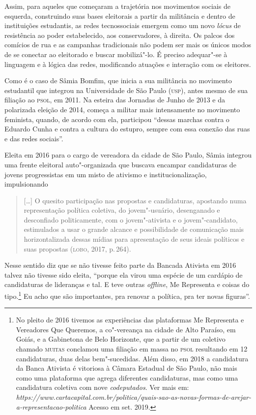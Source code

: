 Assim, para aqueles que começaram a trajetória nos movimentos sociais de
esquerda, construindo suas bases eleitorais a partir da militância e
dentro de instituições estudantis, as redes tecnossociais emergem como
um novo \emph{lócus} de resistência ao poder estabelecido, aos
conservadores, à direita. Os palcos dos comícios de rua e as campanhas
tradicionais não podem ser mais os únicos modos de se conectar ao
eleitorado e buscar mobilizá"-lo. É preciso adequar"-se à linguagem e à
lógica das redes, modificando atuações e interação com os eleitores.

Como é o caso de Sâmia Bomfim, que inicia a sua militância no movimento
estudantil que integrou na Universidade de São Paulo (\textsc{usp}), antes mesmo
de sua filiação ao \textsc{psol}, em 2011. Na esteira das Jornadas de Junho de
2013 e da polarizada eleição de 2014, começa a militar mais intensamente
no movimento feminista, quando, de acordo com ela, participou ``dessas
marchas contra o Eduardo Cunha e contra a cultura do estupro, sempre com
essa conexão das ruas e das redes sociais''.

Eleita em 2016 para o cargo de vereadora da cidade de São Paulo, Sâmia
integrou uma frente eleitoral auto"-organizada que buscava encampar
candidaturas de jovens progressistas em um misto de ativismo e
institucionalização, impulsionando

\begin{quote}
{[}\ldots{}{]} O quesito participação nas propostas e candidaturas, apostando
numa representação política coletiva, do jovem"-usuário, desenganado e
desconfiado politicamente, com o jovem"-ativista e o jovem"-candidato,
estimulados a usar o grande alcance e possibilidade de comunicação mais
horizontalizada dessas mídias para apresentação de seus ideais políticos
e suas propostas (\textsc{lobo}, 2017, p.\,264).
\end{quote}

Nesse sentido diz que se não tivesse feito parte da Bancada Ativista em
2016 talvez não tivesse sido eleita, ``porque ela virou uma espécie de
um cardápio de candidaturas de lideranças e tal. E teve outras \emph{offline},
Me Representa e coisas do tipo.\footnote{No pleito de 2016 tivemos as
  experiências das plataformas Me Representa e Vereadores Que Queremos,
  a co"-vereança na cidade de Alto Paraíso, em Goiás, e a Gabinetona de
  Belo Horizonte, que a partir de um coletivo chamado \textsc{muitas} conclamou
  uma filiação em massa no \textsc{psol} resultando em 12 candidaturas, duas
  delas bem"-sucedidas. Além disso, em 2018 a candidatura da Banca
  Ativista é vitoriosa à Câmara Estadual de São Paulo, não mais como uma
  plataforma que agrega diferentes candidaturas, mas como uma
  candidatura coletiva com nove \emph{codeputados}. Ver mais em:
  \emph{https://www.cartacapital.com.br/politica/quais-sao-as-novas-formas-de-arejar-a-representacao-politica}
  Acesso em set. 2019.} Eu acho que são importantes, pra renovar a
política, pra ter novas figuras''.

